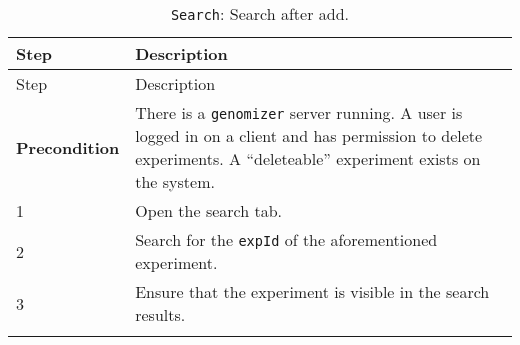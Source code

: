 \begin{longtable}[c]{@{}ll@{}}
\caption{\texttt{Search}: Search after add.}\tabularnewline
\toprule
\begin{minipage}[b]{0.31\columnwidth}\raggedright\strut
Step
\strut\end{minipage} &
\begin{minipage}[b]{0.63\columnwidth}\raggedright\strut
Description
\strut\end{minipage}\tabularnewline
\midrule
\endfirsthead
\toprule
\begin{minipage}[b]{0.31\columnwidth}\raggedright\strut
Step
\strut\end{minipage} &
\begin{minipage}[b]{0.63\columnwidth}\raggedright\strut
Description
\strut\end{minipage}\tabularnewline
\midrule
\endhead
\begin{minipage}[t]{0.31\columnwidth}\raggedright\strut
\textbf{Precondition}
\strut\end{minipage} &
\begin{minipage}[t]{0.63\columnwidth}\raggedright\strut
There is a \texttt{genomizer} server running. A user is logged in on a
client and has permission to delete experiments. A ``deleteable''
experiment exists on the system.
\strut\end{minipage}\tabularnewline
\begin{minipage}[t]{0.31\columnwidth}\raggedright\strut
1
\strut\end{minipage} &
\begin{minipage}[t]{0.63\columnwidth}\raggedright\strut
Open the search tab.
\strut\end{minipage}\tabularnewline
\begin{minipage}[t]{0.31\columnwidth}\raggedright\strut
2
\strut\end{minipage} &
\begin{minipage}[t]{0.63\columnwidth}\raggedright\strut
Search for the \texttt{expId} of the aforementioned experiment.
\strut\end{minipage}\tabularnewline
\begin{minipage}[t]{0.31\columnwidth}\raggedright\strut
3
\strut\end{minipage} &
\begin{minipage}[t]{0.63\columnwidth}\raggedright\strut
Ensure that the experiment is visible in the search results.
\strut\end{minipage}\tabularnewline
\begin{minipage}[t]{0.31\columnwidth}\raggedright\strut

\end{minipage}
\end{longtable}
